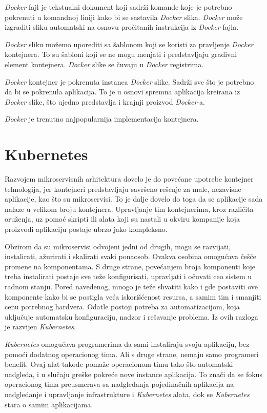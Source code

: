 \textit{Docker} fajl je tekstualni dokument koji sadrži komande koje je potrebno pokrenuti 
u komandnoj liniji kako bi se sastavila \textit{Docker} slika. \textit{Docker} može izgraditi sliku automatski 
na osnovu pročitanih instrukcija iz \textit{Docker} fajla.

\textit{Docker} sliku možemo uporediti sa šablonom koji se koristi za pravljenje \textit{Docker} kontejnera. 
To su šabloni koji se ne mogu menjati i predstavljaju gradivni element kontejnera.
\textit{Docker} slike se čuvaju u \textit{Docker} registrima. 

\textit{Docker} kontejner je pokrenuta instanca \textit{Docker} slike. Sadrži sve što je potrebno da bi se 
pokrenula aplikacija. To je u osnovi spremna aplikacija kreirana iz \textit{Docker} slike, 
što ujedno predstavlja i krajnji proizvod \textit{Docker}-a.~\cite{docker}

\textit{Docker} je trenutno najpopularnija implementacija kontejnera.

\section{Kubernetes}\label{sec:kubernetes}

Razvojem mikroservisnih arhitektura dovelo je do povećane upotrebe kontejner tehnologija, jer 
kontejneri predstavljaju savršeno rešenje za male, nezavisne aplikacije, kao što su mikroservisi. 
To je dalje dovelo do toga da se aplikacije sada nalaze u velikom broju kontejnera. Upravljanje 
tim kontejnerima, kroz različita oruženja, uz pomoć skripti ili alata koji su nastali u okviru 
kompanije koja proizvodi aplikaciju postaje ubrzo jako kompleksno.

Obzirom da su mikroservisi odvojeni jedni od drugih, mogu se razvijati, instalirati, ažurirati i skalirati svaki ponaosob.
Ovakva osobina omogućava češće promene na komponentama. S druge strane, povećanjem broja komponenti koje treba 
instalirati postaje sve teže konfigurisati, upravljati i očuvati ceo sistem u radnom stanju. Pored navedenog, mnogo 
je teže shvatiti kako i gde postaviti ove komponente kako bi se postigla veća iskorišćenost resursa, a samim tim i 
smanjiti cenu potrebnog hardvera. Odatle postoji potreba za automatizacijom, koja uključuje automatsku konfiguraciju,
nadzor  i rešavanje problema. Iz ovih razloga je razvijen \textit{Kubernetes}.

\textit{Kubernetes} omogućava programerima da sami instaliraju svoju aplikaciju, bez pomoći dodatnog operacionog tima. 
Ali s druge strane, nemaju samo programeri benefit. Ovaj alat takođe pomaže operacionom timu tako što automatski nadgleda, 
i u slučaju greške pokreće nove instance aplikacija. To znači da se fokus operacionog tima preusmerava sa nadgledanja
pojedinačnih aplikacija na nadgledanje i upravljanje infrastrukture i \textit{Kubernetes} alata, dok se \textit{Kubernetes} stara o samim
aplikacijama.

